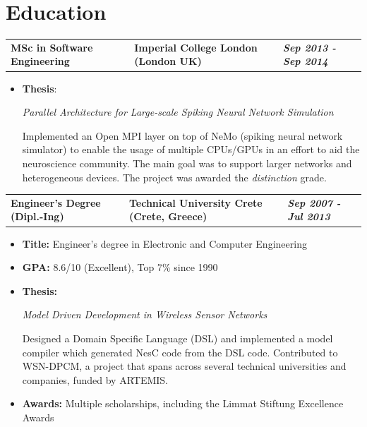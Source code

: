 \documentclass[a4paper,10pt]{article}
\newcommand*{\mahogany}{\textcolor{Mahogany}}
\newcommand{\jobtitle}[4]{
\vspace{0.3cm}
\begin{tabularx}
{\textwidth}
{ >{\raggedright\arraybackslash}p{6.5cm}
  >{\raggedright\arraybackslash}X
  >{\raggedleft\arraybackslash}p{4cm} }
\large\textbf{#1} &
\large\textbf{\mahogany{#2}} \normalsize\textbf{(#3)} &
\textit{\large\textbf{#4}}
\end{tabularx}
\vspace{-0.4cm}
}
\begin{document}
\section{Education}
\jobtitle{MSc in Software Engineering}{Imperial College London}{London UK}{Sep 2013 - Sep 2014}
\begin{itemize}[leftmargin=.27in,label=] \setlength\itemsep{0cm}
\vspace{0.2cm}
\item \normalsize \textbf{Thesis}:
\vspace{-0.1cm}

\textit{Parallel Architecture for Large-scale Spiking Neural Network Simulation}
\vspace{-0.1cm}

Implemented an Open MPI layer on top of NeMo (spiking neural network simulator) to enable the usage of multiple CPUs/GPUs in an effort to aid the neuroscience community.  The main goal was to support larger networks and heterogeneous devices. The project was awarded the \textit{distinction} grade.

\end{itemize}

\vspace{0.1cm}
\jobtitle{Engineer's Degree (Dipl.-Ing)}{Technical University Crete}{Crete, Greece}{Sep 2007 - Jul 2013}
\vspace{0.2cm}

\begin{itemize}[leftmargin=.27in,label=]\setlength\itemsep{-0.1cm}
\item \textbf{Title:} Engineer's degree in Electronic and Computer Engineering

\item\textbf{GPA:} 8.6/10 (Excellent), Top 7\% since 1990

\item \textbf{Thesis:}
\vspace{-0.1cm}

\textit{Model Driven Development in Wireless Sensor Networks}
\vspace{-0.1cm}

Designed a Domain Specific Language (DSL) and implemented a model compiler which generated NesC code from the DSL code. Contributed to WSN-DPCM, a project that spans across several technical universities and companies, funded by ARTEMIS.

\item \textbf{Awards:} Multiple scholarships, including the Limmat Stiftung Excellence Awards

\end{itemize}
\end{document}
